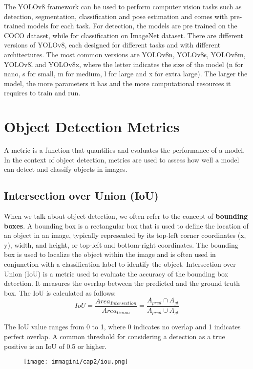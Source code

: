 The YOLOv8 framework can be used to perform computer vision tasks such as detection, segmentation, classification and pose estimation and comes with pre-trained models for each task. For detection, the models are pre trained on the COCO dataset, while for classification on ImageNet dataset. 
There are different versions of YOLOv8, each designed for different tasks and with different architectures. The most common versions are YOLOv8n, YOLOv8s, YOLOv8m, YOLOv8l and YOLOv8x, where the letter indicates the size of the model (n for nano, s for small, m for medium, l for large and x for extra large). The larger the model, the more parameters it has and the more computational resources it requires to train and run.

\section{Object Detection Metrics}
A metric is a function that quantifies and evaluates the performance of a model. In the context of object detection, metrics are used to assess how well a model can detect and classify objects in images. 

\subsection*{Intersection over Union (IoU)}
When we talk about object detection, we often refer to the concept of \textbf{bounding boxes}. A bounding box is a rectangular box that is used to define the location of an object in an image, typically represented by its top-left corner coordinates (x, y), width, and height, or top-left and bottom-right coordinates. The bounding box is used to localize the object within the image and is often used in conjunction with a classification label to identify the object.
Intersection over Union (IoU) is a metric used to evaluate the accuracy of the bounding box detection. It measures the overlap between the predicted and the ground truth box. The IoU is calculated as follows:
\begin{equation}
    IoU = \frac{Area_{Intersection}}{Area_{Union}} = \frac{A_{pred} \cap A_{gt}}{A_{pred} \cup A_{gt}}
    \label{eq:IoU}
\end{equation}

The IoU value ranges from 0 to 1, where 0 indicates no overlap and 1 indicates perfect overlap. A common threshold for considering a detection as a true positive is an IoU of 0.5 or higher.


\begin{figure}[htbp]
    \centering
    \texttt{[image: immagini/cap2/iou.png]}
    \caption{}
    \label{fig:iou}
\end{figure}

